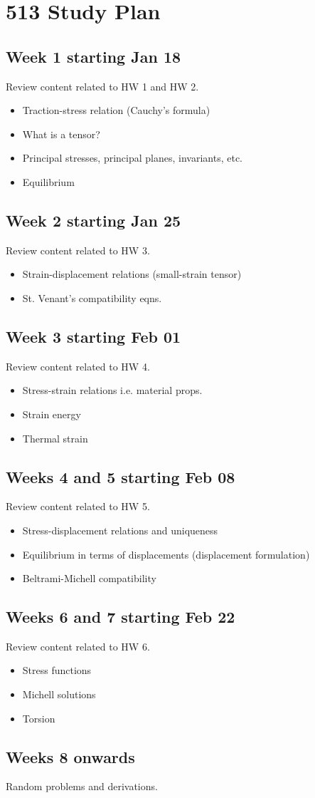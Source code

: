 \documentclass{article}
\begin{document}
\section{513 Study Plan}

\subsection{Week 1 starting Jan 18}
Review content related to HW 1 and HW 2.
\begin{itemize}
	\item Traction-stress relation (Cauchy's formula)
	\item What is a tensor?
	\item Principal stresses, principal planes, invariants, etc.
	\item Equilibrium
\end{itemize}

\subsection{Week 2 starting Jan 25}
Review content related to HW 3.
\begin{itemize}
	\item Strain-displacement relations (small-strain tensor)
	\item St. Venant's compatibility eqns.
\end{itemize}

\subsection{Week 3 starting Feb 01}
Review content related to HW 4.
\begin{itemize}
	\item Stress-strain relations i.e. material props.
	\item Strain energy
	\item Thermal strain
\end{itemize}

\subsection{Weeks 4 and 5 starting Feb 08}
Review content related to HW 5.
\begin{itemize}
	\item Stress-displacement relations and uniqueness
	\item Equilibrium in terms of displacements (displacement formulation)
	\item Beltrami-Michell compatibility
\end{itemize}

\subsection{Weeks 6 and 7 starting Feb 22}
Review content related to HW 6.
\begin{itemize}
	\item Stress functions
	\item Michell solutions
	\item Torsion
\end{itemize}
\subsection{Weeks 8 onwards}
Random problems and derivations.
\end{document}
